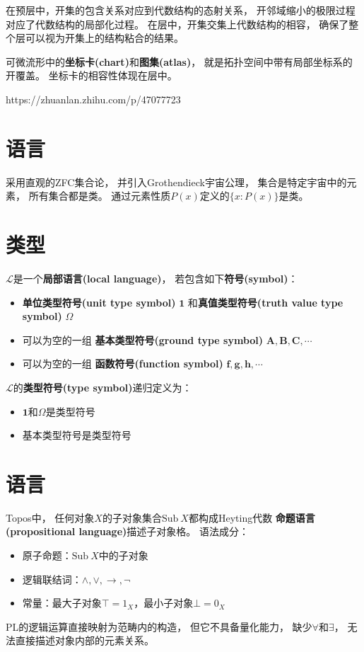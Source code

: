 \documentclass[10pt, openany]{book}
\begin{document}
在预层中，开集的包含关系对应到代数结构的态射关系，
开邻域缩小的极限过程对应了代数结构的局部化过程。
在层中，开集交集上代数结构的相容，
确保了整个层可以视为开集上的结构粘合的结果。

可微流形中的\textbf{坐标卡(chart)}和\textbf{图集(atlas)}，
就是拓扑空间中带有局部坐标系的开覆盖。
坐标卡的相容性体现在层中。


https://zhuanlan.zhihu.com/p/47077723

\section{语言}

采用直观的ZFC集合论，
并引入Grothendieck宇宙公理，
集合是特定宇宙中的元素，
所有集合都是类。
通过元素性质$P(x)$定义的$\{x:P(x)\}$是类。

\section{类型}

$\mathscr L$是一个\textbf{局部语言(local language)}，
若包含如下\textbf{符号(symbol)}：
\begin{itemize}
  \item 
  \textbf{单位类型符号(unit type symbol)} $\textbf{1}$
  和\textbf{真值类型符号(truth value type symbol)} $\Omega$
  \item 可以为空的一组
  \textbf{基本类型符号(ground type symbol)} $\textbf{A},\textbf{B},\textbf{C},\cdots$
  \item 可以为空的一组
  \textbf{函数符号(function symbol)} $\textbf{f},\textbf{g},\textbf{h},\cdots$
\end{itemize}

$\mathscr L$的\textbf{类型符号(type symbol)}递归定义为：
\begin{itemize}
  \item 
  $\textbf{1}$和$\Omega$是类型符号
  \item
  基本类型符号是类型符号
\end{itemize}
  
\section{语言}

Topos中，
任何对象$X$的子对象集合$\text{Sub} \ X$都构成Heyting代数
\textbf{命题语言(propositional language)}描述子对象格。
语法成分：
\begin{itemize}
  \item 原子命题：$\text{Sub} \ X$中的子对象
  \item 逻辑联结词：$\wedge,\vee, \to, \neg$
  \item 常量：最大子对象$\top = 1_X$，最小子对象$\bot = 0_X$
\end{itemize}
PL的逻辑运算直接映射为范畴内的构造，
但它不具备量化能力，
缺少$\forall$和$\exists$，
无法直接描述对象内部的元素关系。
\end{document}

